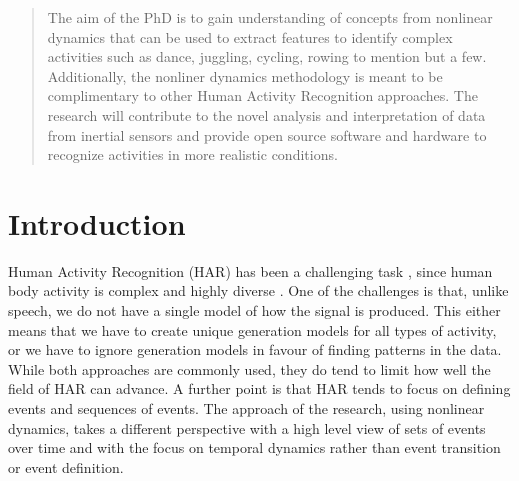 \documentclass{sigchi}
\begin{document}
\begin{abstract}
The aim of the PhD is to gain understanding of concepts from nonlinear dynamics that 
can be used to extract features to identify complex activities such as dance, 
juggling, cycling, rowing to mention but a few. Additionally, the nonliner dynamics 
methodology is meant to be complimentary to other Human Activity Recognition 
approaches.
The research will contribute to the novel analysis and interpretation of data from 
inertial sensors and provide open source software and hardware to recognize activities 
in more realistic conditions. 


% 



\end{abstract}



\section{Introduction}
Human Activity Recognition (HAR) has been a challenging task \cite{Aggarwal2004}, 
since human body activity is complex and highly diverse \cite{Kim2010}.
One of the challenges is that, unlike speech, we do not have a single model 
of how the signal is produced.  
This either means that we have to create unique generation models for all types 
of activity, or we have to ignore generation models in favour of 
finding patterns in the data.  While both approaches are commonly used, 
they do tend to limit how well the field of HAR can advance. 
A further point is that HAR tends to focus on defining events and sequences of events.
The approach of the research, using nonlinear dynamics, takes a different 
perspective with a high level view of sets of events over time and with 
the focus on temporal 
dynamics rather than event transition or event definition. 
\end{document}
